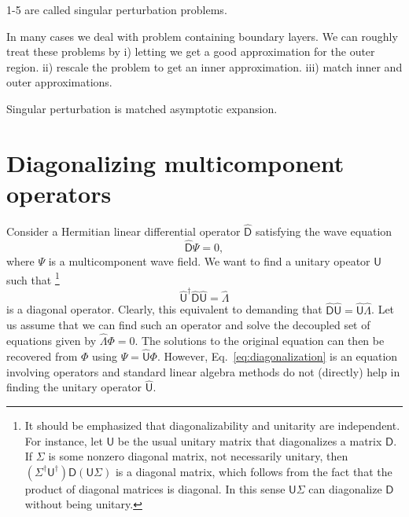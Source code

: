 1-5 are called singular perturbation problems.

In many cases we deal with problem containing boundary layers. We can roughly treat these problems by
i) letting  we get a good approximation for the outer region.
ii) rescale the problem to get an inner approximation.
iii) match inner and outer approximations.

Singular perturbation is matched asymptotic expansion.

\section{Diagonalizing multicomponent operators}

Consider a Hermitian linear differential operator $\hat{\mathsf{D}}$ satisfying the wave equation
%
\begin{equation}
  \hat{\mathsf{D}}\Psi = 0,
\end{equation}
%
where $\Psi$ is a multicomponent wave field.
%
We want to find a unitary opeator ${\mathsf{U}}$ such that%
\footnote{It should be emphasized that diagonalizability and unitarity are independent. For instance, let $\mathsf{U}$ be the usual unitary matrix that diagonalizes a matrix $\mathsf{D}$.
  If $\Sigma$ is some nonzero diagonal matrix, not necessarily unitary, then $(\Sigma^{\dagger}\mathsf{U}^{\dagger})\mathsf{D}(\mathsf{U}\Sigma)$ is a diagonal matrix, which follows from the fact that the product of diagonal matrices is diagonal.
  In this sense $\mathsf{U}\Sigma$ can diagonalize $\mathsf{D}$ without being unitary.}
%
\begin{equation}
  \hat{\mathsf{U}}^{\dagger}\hat{\mathsf{D}}\hat{\mathsf{U}} = \hat{\Lambda}\label{eq:diagonalization}
\end{equation}
%
is a diagonal operator.
Clearly, this equivalent to demanding that $\hat{\mathsf{D}}\hat{\mathsf{U}} = \hat{\mathsf{U}}\hat{\Lambda}$.
Let us assume that we can find such an operator and solve the decoupled set of equations given by $\hat{\Lambda}\Phi = 0$.
The solutions to the original equation can then be recovered from $\Phi$ using $\Psi = \hat{\mathsf{U}}\Phi$.
However, Eq.~\eqref{eq:diagonalization} is an equation involving operators and standard linear algebra methods do not (directly) help in finding the unitary operator $\hat{\mathsf{U}}$.

